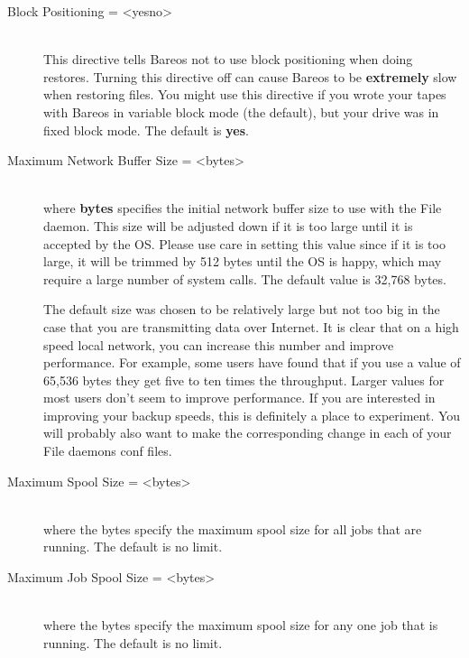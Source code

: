 \begin{description}
\item [Block Positioning = {\textless}yes{\textbar}no{\textgreater}] \hfill \\
This directive tells Bareos not to use block positioning when doing restores.
Turning this directive off can cause Bareos to be {\bf extremely} slow
when restoring files.  You might use this directive if you wrote your
tapes with Bareos in variable block mode (the default), but your drive
was in fixed block mode. The default is {\bf yes}.


\item [Maximum Network Buffer Size = {\textless}bytes{\textgreater}] \hfill \\
where {\bf bytes} specifies the initial network buffer  size to use with the
File daemon.  This size will be adjusted down if it is too large until
it is accepted by the OS. Please use care in setting this value since if
it is too large, it will be trimmed by 512 bytes until the OS is happy,
which may require a large number of system calls.  The default value is
32,768 bytes.

The default size was chosen to be relatively large but not too big in
the case that you are transmitting data over Internet.  It is clear that
on a high speed local network, you can increase this number and improve
performance. For example, some users have found that if you use a value
of 65,536 bytes they get five to ten times the throughput.  Larger values for
most users don't seem to improve performance. If you are interested
in improving your backup speeds, this is definitely a place to
experiment. You will probably also want to make the corresponding change
in each of your File daemons conf files.

\item [Maximum Spool Size = {\textless}bytes{\textgreater}] \hfill \\
where the bytes specify the maximum spool size for all jobs that are
running.  The default is no limit.

\item [Maximum Job Spool Size = {\textless}bytes{\textgreater}] \hfill \\
where the bytes specify the maximum spool size for any one job  that is
running. The default is no limit.


\end{description}
